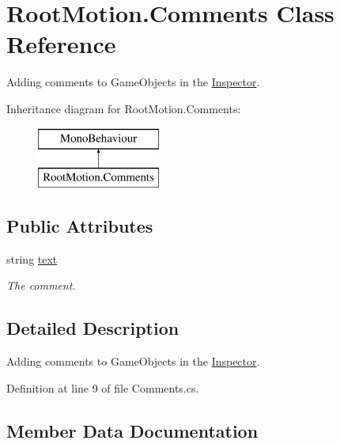 \hypertarget{class_root_motion_1_1_comments}{}\section{Root\+Motion.\+Comments Class Reference}
\label{class_root_motion_1_1_comments}


Adding comments to Game\+Objects in the \mbox{\hyperlink{class_root_motion_1_1_inspector}{Inspector}}.  


Inheritance diagram for Root\+Motion.\+Comments\+:\begin{figure}[H]
\begin{center}
\leavevmode
\includegraphics[height=2.000000cm]{class_root_motion_1_1_comments}
\end{center}
\end{figure}
\subsection*{Public Attributes}
\begin{DoxyCompactItemize}
\item 
string \mbox{\hyperlink{class_root_motion_1_1_comments_af299259f4f360597241b54bd5cd75a4a}{text}}
\begin{DoxyCompactList}\small\item\em The comment. \end{DoxyCompactList}\end{DoxyCompactItemize}


\subsection{Detailed Description}
Adding comments to Game\+Objects in the \mbox{\hyperlink{class_root_motion_1_1_inspector}{Inspector}}. 



Definition at line 9 of file Comments.\+cs.



\subsection{Member Data Documentation}
\mbox{\label{class_root_motion_1_1_comments_af299259f4f360597241b54bd5cd75a4a}} 
